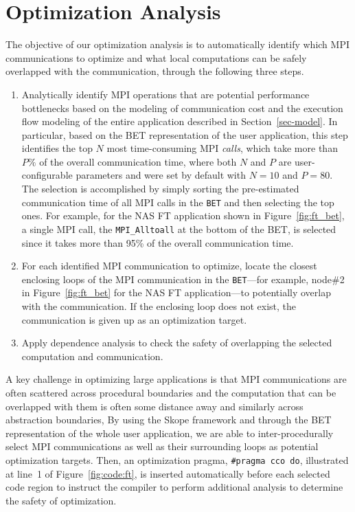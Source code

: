 \section{Optimization Analysis}
\label {sec-analysis}

The objective of our optimization analysis is to automatically identify which MPI communications to optimize
and  what local computations can be safely overlapped with the communication, through the following three steps.

\begin{enumerate}

\item Analytically identify MPI operations that are potential
  performance bottlenecks based on the modeling of communication cost
  and the execution flow modeling of the entire application described
  in Section~\ref{sec-model}.  In particular, based on the BET
  representation of the user application, this step identifies the top
  $N$ most time-consuming MPI \emph{calls}, which take more than $P\%$
  of the overall communication time, where both $N$ and $P$ are
  user-configurable parameters and were set by default with $N=10$ and
  $P=80$.  The selection is accomplished by simply sorting the
  pre-estimated communication time of all MPI calls in the
  \texttt{BET} and then selecting the top ones.  For example, for the
  NAS FT application shown in Figure~\ref{fig:ft_bet}, a single MPI
  call, the \texttt{MPI\_Alltoall} at the bottom of the BET, is
  selected since it takes more than 95\% of the overall communication
  time.

\item For each identified MPI communication to optimize, locate the closest
  enclosing loops of the MPI communication in the \texttt{BET}---for
  example, node\#2 in Figure~\ref{fig:ft_bet} for the NAS FT
  application---to potentially overlap with the communication.  If the
  enclosing loop does not exist, the communication is given up as an
  optimization target.

\item Apply dependence analysis to check the safety of overlapping the
  selected computation and communication.

\end{enumerate}

A key challenge in optimizing large applications is that MPI
communications are often scattered across procedural boundaries and
the computation that can be overlapped with them is often some
distance away and similarly across abstraction boundaries, By using
the Skope framework and through the BET representation of the whole
user application, we are able to inter-procedurally select MPI
communications as well as their surrounding loops as potential optimization targets.
Then, an optimization pragma,  \texttt{\#pragma cco do}, 
illustrated at line~1 of Figure~\ref{fig:code:ft}, is inserted automatically before each selected code region
to instruct the compiler to perform additional analysis to determine the safety of optimization.

